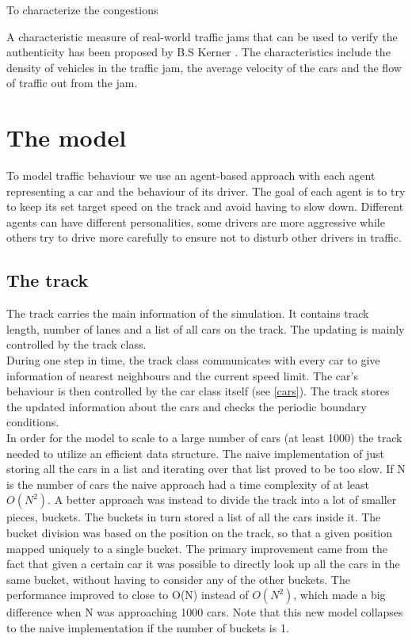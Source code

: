 \documentclass[11pt,a4paper,twocolumn]{article}
\begin{document}
To characterize the congestions 

A characteristic measure of real-world traffic jams that can be used to verify the authenticity has been proposed by B.S Kerner \cite{kerner96trafficjam}. The characteristics include the density of vehicles in the traffic jam, the average velocity of the cars and the flow of traffic out from the jam.


\section{The model}
To model traffic behaviour we use an agent-based approach with each agent representing a car and the behaviour of its driver. The goal of each agent is to try to keep its set target speed on the track and avoid having to slow down. Different agents can have different personalities, some drivers are more aggressive while others try to drive more carefully to ensure not to disturb other drivers in traffic.

\subsection{The track}\label{track}
The track carries the main information of the simulation. It contains track length, number of lanes and a list of all cars on the track. The updating is mainly controlled by the track class.  \\
During one step in time, the track class communicates with every car to give information of nearest neighbours and the current speed limit. The car's behaviour is then controlled by the car class itself (see \ref{cars}). The track stores the updated information about the cars and checks the periodic boundary conditions. \\

In order for the model to scale to a large number of cars (at least 1000) the track needed to utilize an efficient data structure. The naive implementation of just storing all the cars in a list and iterating over that list proved to be too slow. If N is the number of cars the naive approach had a time complexity of at least $O(N^2)$. A better approach was instead to divide the track into a lot of smaller pieces, buckets. The buckets in turn stored a list of all the cars inside it. The bucket division was based on the position on the track, so that a given position mapped uniquely to a single bucket. The primary improvement came from the fact that given a certain car it was possible to directly look up all the cars in the same bucket, without having to consider any of the other buckets. The performance improved to close to O(N) instead of $O(N^2)$, which made a big difference when N was approaching 1000 cars. Note that this new model collapses to the naive implementation if the number of buckets is 1.
\end{document}
